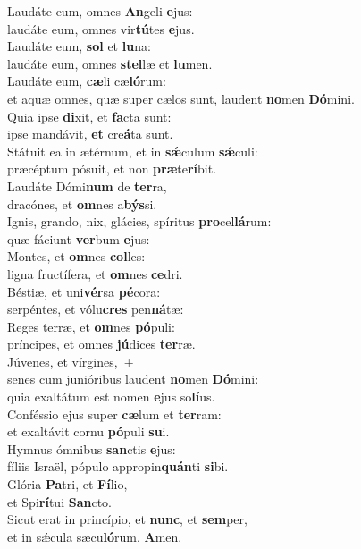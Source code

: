 \evenverse Laudáte eum, omnes \textbf{An}geli \textbf{e}jus:~\*\\
\evenverse laudáte eum, omnes vir\textbf{tú}tes \textbf{e}jus.\\
\oddverse Laudáte eum, \textbf{sol} et \textbf{lu}na:~\*\\
\oddverse laudáte eum, omnes \textbf{stel}læ et \textbf{lu}men.\\
\evenverse Laudáte eum, \textbf{cæ}li cæ\textbf{ló}rum:~\*\\
\evenverse et aquæ omnes, quæ super cælos sunt, laudent \textbf{no}men \textbf{Dó}mini.\\
\oddverse Quia ipse \textbf{di}xit, et \textbf{fa}cta sunt:~\*\\
\oddverse ipse mandávit, \textbf{et} cre\textbf{á}ta sunt.\\
\evenverse Státuit ea in ætérnum, et in \textbf{sǽ}culum \textbf{sǽ}culi:~\*\\
\evenverse præcéptum pósuit, et non \textbf{præ}te\textbf{rí}bit.\\
\oddverse Laudáte Dómi\textbf{num} de \textbf{ter}ra,~\*\\
\oddverse dracónes, et \textbf{om}nes a\textbf{býs}si.\\
\evenverse Ignis, grando, nix, glácies, spíritus \textbf{pro}cel\textbf{lá}rum:~\*\\
\evenverse quæ fáciunt \textbf{ver}bum \textbf{e}jus:\\
\oddverse Montes, et \textbf{om}nes \textbf{col}les:~\*\\
\oddverse ligna fructífera, et \textbf{om}nes \textbf{ce}dri.\\
\evenverse Béstiæ, et uni\textbf{vér}sa \textbf{pé}cora:~\*\\
\evenverse serpéntes, et vólu\textbf{cres} pen\textbf{ná}tæ:\\
\oddverse Reges terræ, et \textbf{om}nes \textbf{pó}puli:~\*\\
\oddverse príncipes, et omnes \textbf{jú}dices \textbf{ter}ræ.\\
\evenverse Júvenes, et vírgines,~+\\
\evenverse  senes cum junióribus laudent \textbf{no}men \textbf{Dó}mini:~\*\\
\evenverse quia exaltátum est nomen \textbf{e}jus so\textbf{lí}us.\\
\oddverse Conféssio ejus super \textbf{cæ}lum et \textbf{ter}ram:~\*\\
\oddverse et exaltávit cornu \textbf{pó}puli \textbf{su}i.\\
\evenverse Hymnus ómnibus \textbf{san}ctis \textbf{e}jus:~\*\\
\evenverse fíliis Israël, pópulo appropin\textbf{quán}ti \textbf{si}bi.\\
\oddverse Glória \textbf{Pa}tri, et \textbf{Fí}lio,~\*\\
\oddverse et Spi\textbf{rí}tui \textbf{San}cto.\\
\evenverse Sicut erat in princípio, et \textbf{nunc}, et \textbf{sem}per,~\*\\
\evenverse et in sǽcula sæcu\textbf{ló}rum. \textbf{A}men.\\
